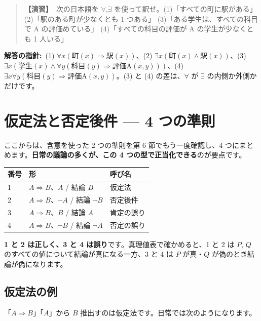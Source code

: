 \documentclass{article}
\begin{document}
\begin{quote}
\textbf{【演習】}\ 次の日本語を \(\forall\),\(\exists\) を使って訳せ。(1)「すべての町に駅がある」 (2)「駅のある町が少なくとも 1 つある」 (3)「ある学生は、すべての科目で A の評価めている」 (4)「すべての科目の評価が A の学生が少なくとも 1 人いる」
\end{quote}

\textbf{解答の指針:}\ (1) \(\forall x \left( \mathrm{町}(x) \Rightarrow \mathrm{駅}(x) \right)\)、(2) \(\exists x \left( \mathrm{町}(x) \land \mathrm{駅}(x) \right)\)、(3) \(\exists x \left( \mathrm{学生}(x) \land \forall y \left( \mathrm{科目}(y) \Rightarrow \mathrm{評価A}(x, y) \right) \right)\)、(4) \(\exists x \forall y \left( \mathrm{科目}(y) \Rightarrow \mathrm{評価A}(x, y) \right)\)。(3) と (4) の差は、\(\forall\) が \(\exists\) の内側か外側かだけです。

\section{仮定法と否定後件 — 4 つの準則}

ここからは、含意を使った 2 つの準則を第 6 節でもう一度確認し、4 つにまとめます。\textbf{日常の議論の多くが、この 4 つの型で正当化できる}のが要点です。

\begin{center}
\begin{tabular}{|l|l|l|}
\hline
番号 & 形 & 呼び名 \\
\hline
1 & \(A \Rightarrow B\)、\(A\) / 結論 \(B\) & 仮定法 \\
2 & \(A \Rightarrow B\)、\(\neg A\) / 結論 \(\neg B\) & 否定後件 \\
3 & \(A \Rightarrow B\)、\(B\) / 結論 \(A\) & 肯定の誤り \\
4 & \(A \Rightarrow B\)、\(\neg B\) / 結論 \(\neg A\) & 否定の誤り \\
\hline
\end{tabular}
\end{center}

\textbf{1 と 2 は正しく、3 と 4 は誤り}です。真理値表で確かめると、1 と 2 は \(P\), \(Q\) のすべての値について結論が真になる一方、3 と 4 は \(P\) が真・\(Q\) が偽のとき結論が偽になります。

\subsection{仮定法の例}

「\(A \Rightarrow B\)」「\(A\)」から \(B\) 推出すのは仮定法です。日常では次のようになります。
\end{document}
